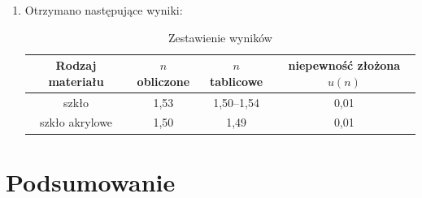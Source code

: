 \documentclass [a4paper,11pt]{article}
\begin{document}
\begin{enumerate}[label=\alph*)]
		
		\item Otrzymano następujące wyniki:
		\begin{table}[!h]
			\caption{Zestawienie wyników}
			\label{tab:zestawienie}
			\begin{center}
				\begin{tabular}{|c|c|c|c|}
					\hline Rodzaj materiału & $n$ obliczone & $n$ tablicowe & niepewność złożona $u(n)$ \\
					\hline szkło & 1,53 & 1,50–1,54 & 0,01 \\
					\hline szkło akrylowe & 1,50 & 1,49 & 0,01 \\  
					\hline 
				\end{tabular} 
			\end{center}
		\end{table}

	
	\end{enumerate}
	
	\section{Podsumowanie}
	\begin{center}
	
	\end{center}
\vspace{1em}
\end{document}
